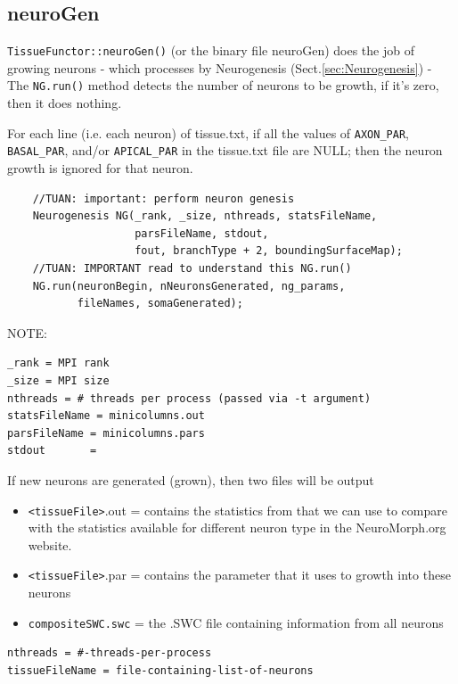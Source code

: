 \subsection{neuroGen}
\label{sec:neuroGen}

\verb!TissueFunctor::neuroGen()! (or the binary file neuroGen) does the job of
growing neurons - which processes by Neurogenesis (Sect.\ref{sec:Neurogenesis})
- The \verb!NG.run()! method detects the number of neurons to be growth, if it's
zero, then it does nothing.

For each line (i.e. each neuron) of tissue.txt, if all the values of
\verb!AXON_PAR!, \verb!BASAL_PAR!, and/or \verb!APICAL_PAR! in the tissue.txt
file are NULL; then the neuron growth is ignored for that neuron. 
\begin{verbatim}
	//TUAN: important: perform neuron genesis
    Neurogenesis NG(_rank, _size, nthreads, statsFileName, 
                    parsFileName, stdout,
                    fout, branchType + 2, boundingSurfaceMap);
	//TUAN: IMPORTANT read to understand this NG.run()
    NG.run(neuronBegin, nNeuronsGenerated, ng_params, 
           fileNames, somaGenerated);
\end{verbatim}

NOTE:
\begin{verbatim}
_rank = MPI rank
_size = MPI size
nthreads = # threads per process (passed via -t argument)
statsFileName = minicolumns.out
parsFileName = minicolumns.pars
stdout       = 
\end{verbatim}

If new neurons are generated (grown), then two files will be output
\begin{itemize}
  \item \verb!<tissueFile>!.out = contains the statistics from that we can use
  to compare with the statistics available for different neuron type in the
  NeuroMorph.org website.
  
  \item \verb!<tissueFile>!.par = contains the parameter that it uses to growth
  into these neurons
  
  \item \verb!compositeSWC.swc! = the .SWC file containing information from all
  neurons
\end{itemize}

\begin{verbatim}
nthreads = #-threads-per-process 
tissueFileName = file-containing-list-of-neurons
\end{verbatim}


